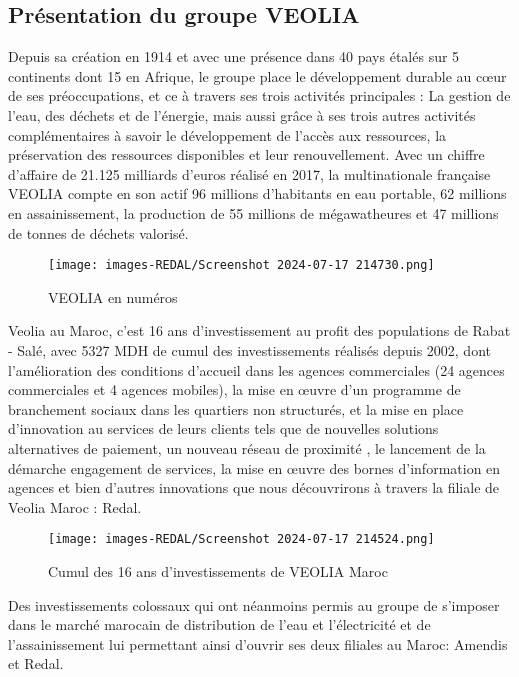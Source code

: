 \subsection{Présentation du groupe VEOLIA}

Depuis sa création en 1914 et avec une présence dans 40 pays étalés sur 5 continents dont 15 
en Afrique, le groupe place le développement durable au cœur de ses préoccupations, et ce à 
travers ses trois activités principales : La gestion de l’eau, des déchets et de l’énergie, mais 
aussi grâce à ses trois autres activités complémentaires à savoir le développement de l’accès 
aux ressources, la préservation des ressources disponibles et leur renouvellement. 
Avec un chiffre d’affaire de 21.125 milliards d’euros réalisé en 2017, la multinationale 
française VEOLIA compte en son actif 96 millions d’habitants en eau portable, 62 millions 
en assainissement, la production de 55 millions de mégawatheures et 47 millions de tonnes 
de déchets valorisé. 

\medskip
\begin{figure}[!h]
    \centering
    \texttt{[image: images-REDAL/Screenshot 2024-07-17 214730.png]}
    \caption{VEOLIA en numéros}
    \label{fig:l}
\end{figure}
\newpage
Veolia au Maroc, c’est 16 ans d’investissement au profit des populations de Rabat - Salé, 
avec 5327 MDH de cumul des investissements réalisés depuis 2002, dont l’amélioration des 
conditions d’accueil dans les agences commerciales (24 agences commerciales et 4 agences 
mobiles), la mise en œuvre d’un programme de branchement sociaux dans les quartiers non 
structurés, et la mise en place d’innovation au services de leurs clients tels que de nouvelles 
solutions alternatives de paiement, un nouveau réseau de proximité , le lancement de la 
démarche engagement de services, la mise en œuvre des bornes d’information en agences et 
bien d’autres innovations que nous découvrirons à travers la filiale de Veolia Maroc : Redal. 

\medskip
\begin{figure}[!h]
    \centering
    \texttt{[image: images-REDAL/Screenshot 2024-07-17 214524.png]}
    \caption{Cumul des 16 ans d’investissements de VEOLIA Maroc}
    \label{fig:2}
\end{figure}


Des investissements colossaux qui ont néanmoins permis au groupe de s'imposer dans le 
marché marocain de distribution de l'eau et l'électricité et de l'assainissement lui permettant 
ainsi d'ouvrir ses deux filiales au Maroc: Amendis et Redal.


